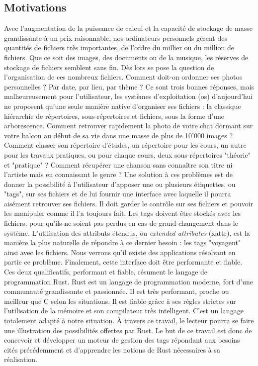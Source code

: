 \subsection{Motivations}
Avec l'augmentation de la puissance de calcul et la capacité de stockage de masse grandissante à un 
prix raisonnable, nos ordinateurs personnels gèrent des quantités de fichiers très importantes, de l'ordre du 
millier ou du million de fichiers. Que ce soit des images, des documents ou de la musique, les 
réserves de stockage de fichiers semblent sans fin. Dès lors se pose la question de l'organisation 
de ces nombreux fichiers. Comment doit-on ordonner ses photos personnelles ? Par date, par lieu, 
par thème ? Ce sont trois bonnes réponses, mais malheureusement pour l'utilisateur, les systèmes d'exploitation 
(\acrshort{os}) d'aujourd'hui ne proposent qu'une seule manière native d'organiser ses fichiers : 
la classique hiérarchie de répertoires, sous-répertoires et fichiers, sous la forme d'une arborescence.
\bigbreak
Comment retrouver rapidement la photo de votre chat dormant sur votre balcon au début de sa vie 
dans une masse de plus de 10'000 images ? Comment classer son répertoire d'études, un répertoire 
pour les cours, un autre pour les travaux pratiques, ou pour chaque cours, deux sous-répertoires 
"théorie" et "pratique" ? Comment récupérer une chanson sans connaître son titre ni l'artiste mais 
en connaissant le genre ? Une solution à ces problèmes est de donner la possibilité à l'utilisateur 
d'apposer une ou plusieurs étiquettes, ou "tags", sur ses fichiers et de lui fournir une interface 
avec laquelle il pourra aisément retrouver ses fichiers. Il doit garder le contrôle sur ses fichiers 
et pouvoir les manipuler comme il l'a toujours fait. Les tags doivent être stockés avec les fichiers, 
pour qu'ils ne soient pas perdus en cas de grand changement dans le système. L'utilisation des 
attributs étendus, ou \textit{extended attributes} (\acrshort{xattr}), est la manière la plus naturelle de répondre à 
ce dernier besoin : les tags "voyagent" ainsi avec les fichiers. Nous verrons qu'il existe 
des applications résolvant en partie ce problème. Finalement, cette interface doit être performante et fiable. 
\bigbreak
Ces deux qualificatifs, performant et fiable, résument le langage de programmation Rust. Rust est 
un langage de programmation moderne, fort d'une communauté grandissante et passionnée. Il est très 
performant, proche ou meilleur que C selon les situations. Il est fiable grâce à ses règles strictes 
sur l'utilisation de la mémoire et son compilateur très intelligent. C'est un langage totalement 
adapté à notre situation. À travers ce travail, le lecteur pourra se faire une illustration des 
possibilités offertes par Rust.
\bigbreak
Le but de ce travail est donc de concevoir et développer un moteur de gestion des tags répondant 
aux besoins cités précédemment et d'apprendre les notions de Rust nécessaires à sa réalisation.
\newpage
